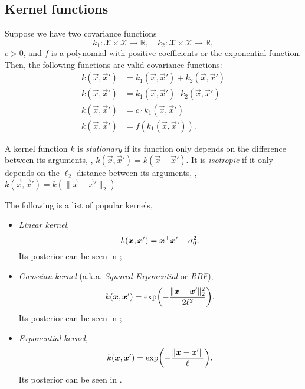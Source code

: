 \subsection{Kernel functions}

Suppose we have two covariance functions \[
  k_1 : \mathcal{X} \times \mathcal{X} \to \mathbb{R}, \hspace{1em} k_2 :
  \mathcal{X} \times \mathcal{X} \to \mathbb{R}
,\]
$c>0$, and $f$ is a polynomial with positive coefficients or the exponential
function. Then, the following functions are valid covariance functions:
\begin{align*}
  k(\vec{x},\vec{x}') &= k_1(\vec{x},\vec{x}')+k_2(\vec{x},\vec{x}') \\
  k(\vec{x},\vec{x}') &= k_1(\vec{x},\vec{x}')\cdot k_2(\vec{x},\vec{x}') \\
  k(\vec{x},\vec{x}') &= c\cdot k_1(\vec{x},\vec{x}') \\
  k(\vec{x},\vec{x}') &= f(k_1(\vec{x},\vec{x}'))
.\end{align*}

\begin{definition}
  A kernel function $k$ is \textit{stationary} if its function only depends on
  the difference between its arguments, \ie,
  $k(\vec{x},\vec{x}')=k(\vec{x}-\vec{x}')$. It is \textit{isotropic} if it only
  depends on the $\ell_2$-distance between its arguments, \ie,
  $k(\vec{x},\vec{x}')=k(\lVert \vec{x}-\vec{x}' \rVert_2)$
\end{definition}

The following is a list of popular kernels,
\begin{itemize}
  \item \textit{Linear kernel}, \[
      k(\bm{x},\bm{x}') = \bm{x}^\top\bm{x}' + \sigma_0^2
    .\]
    Its posterior can be seen in ;

  \item \textit{Gaussian kernel} (a.k.a. \textit{Squared Exponential} or
    \textit{RBF}), \[
      k(\vec{x},\vec{x}') = \exp \lft( -\frac{\lVert \vec{x}-\vec{x}'
      \rVert^2_2}{2\ell^2} \rgt)
    .\]
    Its posterior can be seen in ;

  \item \textit{Exponential kernel}, \[
      k(\vec{x},\vec{x}') = \exp \lft( -\frac{\lVert \vec{x}-\vec{x}' \rVert}{\ell} \rgt)
    .\]
    Its posterior can be seen in .
\end{itemize}

